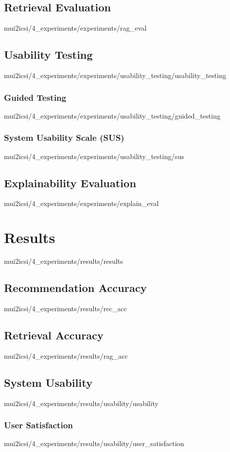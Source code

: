 \documentclass[english,epsbased,copyright,final,printable,covers,extendedindex,firstnumbered,tfm,gnuplot,loc,loe,lof,lot]{tfgtfmthesisuam}
\begin{document}
      \subsection{Retrieval Evaluation\label{SS:RAGEVAL}}{mui2icsi/4_experiments/experiments/rag_eval}
      \subsection{Usability Testing\label{SS:USABILITYTEST}}{mui2icsi/4_experiments/experiments/usability_testing/usability_testing}
        \subsubsection{Guided Testing\label{SSS:GUIDEDTEST}}{mui2icsi/4_experiments/experiments/usability_testing/guided_testing}
        \subsubsection{System Usability Scale (SUS)\label{SSS:SUS}}{mui2icsi/4_experiments/experiments/usability_testing/sus}
      \subsection{Explainability Evaluation\label{SS:EXPLAINEVAL}}{mui2icsi/4_experiments/experiments/explain_eval}

    \section{Results\label{SEC:RESULTS}}{mui2icsi/4_experiments/results/results}
      \subsection{Recommendation Accuracy\label{SS:RECACC}}{mui2icsi/4_experiments/results/rec_acc}
      \subsection{Retrieval Accuracy\label{SS:RAGACC}}{mui2icsi/4_experiments/results/rag_acc}
      \subsection{System Usability\label{SS:USABILITY}}{mui2icsi/4_experiments/results/usability/usability}
        \subsubsection{User Satisfaction\label{SSS:USERSAT}}{mui2icsi/4_experiments/results/usability/user_satisfaction}
\end{document}
